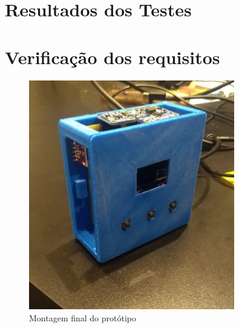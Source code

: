 \documentclass[../monografia.tex]{subfiles}
\begin{document}

\section{Resultados dos Testes}
\section{Verificação dos requisitos}

\begin{figure}[h]
	\centering
	\includegraphics[width=0.8\textwidth]{montagem-final.jpg}
	\caption{Montagem final do protótipo}
	\label{fig:prototipo}
\end{figure}
\end{document}

